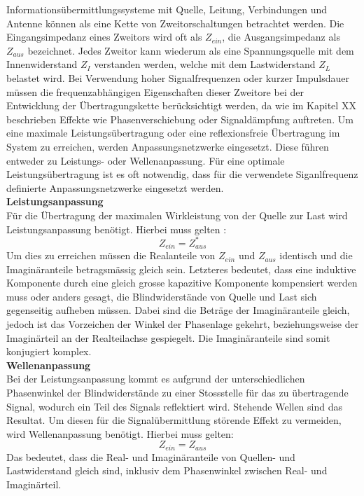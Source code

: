 Informationsübermittlungssysteme mit Quelle, Leitung, Verbindungen und Antenne können als eine Kette von Zweitorschaltungen betrachtet werden. Die Eingangsimpedanz eines Zweitors wird oft als $Z_{ein}$, die Ausgangsimpedanz als $Z_{aus}$ bezeichnet. 
Jedes Zweitor kann wiederum als eine Spannungsquelle mit dem Innenwiderstand $Z_I$ verstanden werden, welche mit dem Lastwiderstand $Z_L$ belastet wird. Bei Verwendung hoher Signalfrequenzen oder kurzer Impulsdauer müssen die frequenzabhängigen Eigenschaften dieser Zweitore bei der Entwicklung der Übertragungskette berücksichtigt werden, da wie im Kapitel XX beschrieben Effekte wie Phasenverschiebung oder Signaldämpfung auftreten. Um eine maximale Leistungsübertragung oder eine reflexionsfreie Übertragung im System zu erreichen, werden Anpassungsnetzwerke eingesetzt. Diese führen entweder zu Leistungs- oder Wellenanpassung. Für eine optimale Leistungsübertragung ist es oft notwendig, dass für die verwendete Siganlfrequenz definierte Anpassungsnetzwerke eingesetzt werden.\\


\textbf{Leistungsanpassung } \\
Für die Übertragung der maximalen Wirkleistung von der Quelle zur Last wird Leistungsanpassung benötigt. Hierbei muss gelten \cite{Tekom}:
\[Z_{ein} = Z_{aus}^*\]
Um dies zu erreichen müssen die Realanteile von $Z_{ein}$ und $Z_{aus}$ identisch und die Imaginäranteile betragsmässig gleich sein. Letzteres bedeutet, dass eine induktive Komponente durch eine gleich grosse kapazitive Komponente kompensiert werden muss oder anders gesagt, die Blindwiderstände von Quelle und Last sich gegenseitig aufheben müssen. Dabei sind die Beträge der Imaginäranteile gleich, jedoch ist das Vorzeichen der Winkel der Phasenlage gekehrt, beziehungsweise der Imaginärteil an der Realteilachse gespiegelt. Die Imaginäranteile sind somit konjugiert komplex.\\

\textbf{Wellenanpassung} \\
Bei der Leistungsanpassung kommt es aufgrund der unterschiedlichen Phasenwinkel der Blindwiderstände zu einer Stossstelle für das zu übertragende Signal, wodurch ein Teil des Signals reflektiert wird. Stehende Wellen sind das Resultat. Um diesen für die Signalübermittlung störende Effekt zu vermeiden, wird Wellenanpassung benötigt. Hierbei muss gelten:
\[Z_{ein} = Z_{aus}\]
Das bedeutet, dass die Real- und Imaginäranteile von Quellen- und Lastwiderstand gleich sind, inklusiv dem Phasenwinkel zwischen Real- und Imaginärteil.\\

